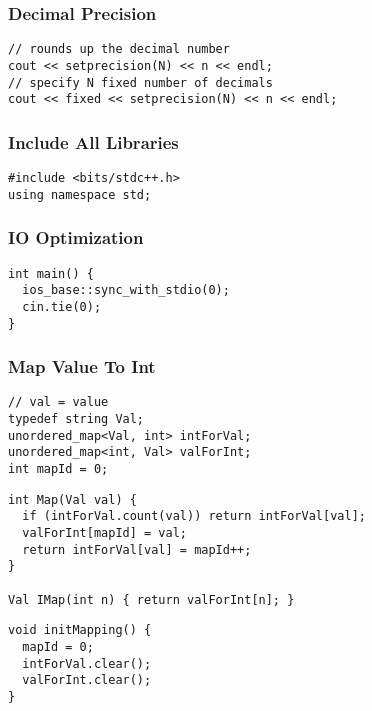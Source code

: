 \documentclass[twoside]{article}
\begin{document}
\begin{multicols*}{2}
\subsubsection*{Decimal Precision}
\begin{verbatim}
// rounds up the decimal number
cout << setprecision(N) << n << endl;
// specify N fixed number of decimals
cout << fixed << setprecision(N) << n << endl;
\end{verbatim}

\subsubsectionfont{\large\bfseries\sffamily\underline}
\subsubsection*{Include All Libraries}
\begin{verbatim}
#include <bits/stdc++.h>
using namespace std;
\end{verbatim}

\subsubsectionfont{\large\bfseries\sffamily\underline}
\subsubsection*{IO Optimization}
\begin{verbatim}
int main() {
  ios_base::sync_with_stdio(0);
  cin.tie(0);
}
\end{verbatim}

\subsubsectionfont{\large\bfseries\sffamily\underline}
\subsubsection*{Map Value To Int}
\begin{verbatim}
// val = value
typedef string Val;
unordered_map<Val, int> intForVal;
unordered_map<int, Val> valForInt;
int mapId = 0;
\end{verbatim}
\vspace{-12pt}
\begin{verbatim}
int Map(Val val) {
  if (intForVal.count(val)) return intForVal[val];
  valForInt[mapId] = val;
  return intForVal[val] = mapId++;
}

Val IMap(int n) { return valForInt[n]; }
\end{verbatim}
\vspace{-12pt}
\begin{verbatim}
void initMapping() {
  mapId = 0;
  intForVal.clear();
  valForInt.clear();
}
\end{verbatim}


\end{multicols*}
\end{document}
